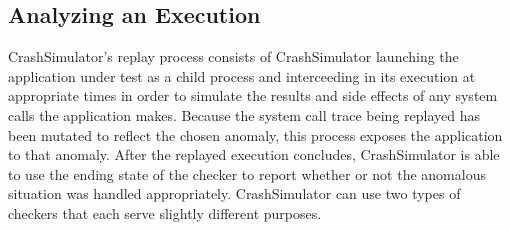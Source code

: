 

    \subsection{Analyzing an Execution}

    CrashSimulator's replay process consists of CrashSimulator launching the
    application under test as a child process and interceeding in its execution
    at appropriate times in order to simulate the results and side effects of any
    system calls the application makes.  Because the system call trace being
    replayed has been mutated to reflect the chosen anomaly, this process
    exposes the application to that anomaly. After the replayed execution
    concludes, CrashSimulator is able to use the ending state of the checker to
    report whether or not the anomalous situation was handled appropriately.
    CrashSimulator
    can use two types of checkers that each serve slightly different purposes.



